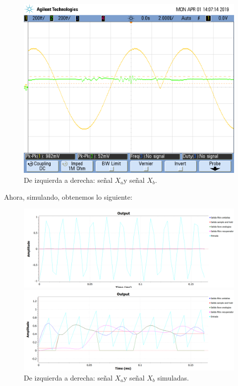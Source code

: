 \documentclass[../../ASSD_TP1_G7.tex]{subfiles}
\begin{document}
\begin{figure}[H]
\begin{centering}
\includegraphics[scale=0.25]{Imagenes/ej_6_b_syh2}\caption{De izquierda a derecha: señal $X_{a}$y señal $X_{b}$.}
\par\end{centering}
\end{figure}

Ahora, simulando, obtenemos lo siguiente:

\begin{figure}[H]

\begin{centering}
\includegraphics[scale=0.5]{Imagenes/simulacion_syh_seno_b2.PNG}
\par\end{centering}
\begin{centering}
\includegraphics[scale=0.5]{Imagenes/simulacion_syh_diente_b2.PNG}\caption{De izquierda a derecha: señal $X_{a}$y señal $X_{b}$ simuladas.}
\par\end{centering}
\end{figure}
\end{document}
